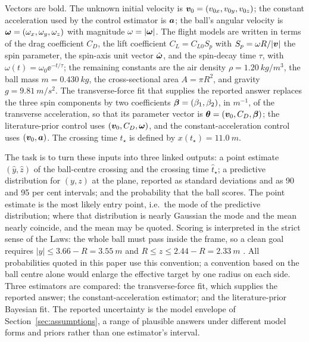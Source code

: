 Vectors are bold. The unknown initial velocity is
$\bm{v}_0=(v_{0x},v_{0y},v_{0z})$; the constant acceleration used by the
control estimator is $\bm{a}$; the ball's angular velocity is
$\bm{\omega}=(\omega_x,\omega_y,\omega_z)$ with magnitude
$\omega=|\bm{\omega}|$. The flight models are written in terms of the drag
coefficient $C_D$, the lift coefficient $C_L=C_{L0}S_p$ with
$S_p=\omega R/|\bm{v}|$ the spin parameter, the spin-axis unit vector
$\hat{\bm{\omega}}$, and the spin-decay time $\tau$, with
$\omega(t)=\omega_0\ee^{-t/\tau}$; the remaining constants are the air density
$\rho=\SI{1.20}{kg/m^3}$, the ball mass $m=\SI{0.430}{kg}$, the
cross-sectional area $A=\pi R^2$, and gravity $g=\SI{9.81}{m/s^2}$. The
transverse-force fit that supplies the reported answer replaces the three spin
components by two coefficients $\bm{\beta}=(\beta_1,\beta_2)$, in
$\si{m^{-1}}$, of the transverse acceleration, so that its parameter vector is
$\bm{\theta}=(\bm{v}_0,C_D,\bm{\beta})$; the literature-prior control uses
$(\bm{v}_0,C_D,\bm{\omega})$, and the constant-acceleration control uses
$(\bm{v}_0,\bm{a})$. The crossing time $t_\star$ is defined by
$x(t_\star)=\SI{11.0}{m}$.

The task is to turn these inputs into three linked outputs: a point estimate
$(\hat y,\hat z)$ of the ball-centre crossing and the crossing time
$\hat t_\star$; a predictive distribution for $(y,z)$ at the plane, reported
as standard deviations and as 90 and 95 per cent intervals; and the
probability that the ball scores. The point estimate is the most likely entry
point, i.e.\ the mode of the predictive distribution; where that distribution
is nearly Gaussian the mode and the mean nearly coincide, and the mean may be
quoted. Scoring is interpreted in the strict sense of the Laws:
the whole ball must pass inside the frame, so a clean goal requires
$|y|\le 3.66-R=\SI{3.55}{m}$ and $R\le z\le 2.44-R=\SI{2.33}{m}$
\citep{ifab2025}. All probabilities quoted in this paper use this convention;
a convention based on the ball centre alone would enlarge the effective target
by one radius on each side. Three estimators are compared: the
transverse-force fit, which supplies the reported answer; the
constant-acceleration estimator; and the literature-prior Bayesian fit. The
reported uncertainty is the model envelope of
Section~\ref{sec:assumptions}, a range of plausible answers under different
model forms and priors rather than one estimator's interval.

